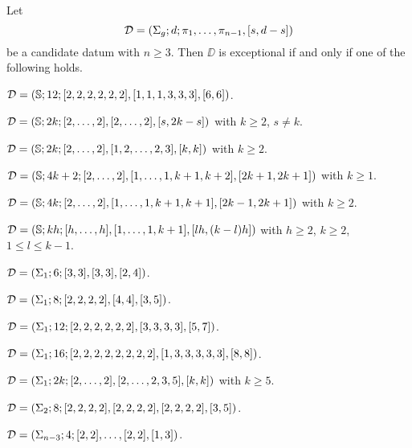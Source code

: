 \begin{solution-hurwitz*}
Let
\[
\mathcal{D}=(\Sigma_{g};d;\pi_1,\ldots,\pi_{n-1},[s,d-s])
\]
be a candidate datum with $n\ge 3$. Then $\DD$ is exceptional if and only if one of the following holds.
\begin{enumarabic}
\item $\mathcal{D}=(\mathbb{S}{};12;[2,2,2,2,2,2],[1,1,1,3,3,3],[6,6])$.
\item $\mathcal{D}=(\mathbb{S}{};2k;[2,\ldots,2],[2,\ldots,2],[s,2k-s])$ with $k\ge 2$, $s\neq k$.
\item $\mathcal{D}=(\mathbb{S}{};2k;[2,\ldots,2],[1,2,\ldots,2,3],[k,k])$ with $k\ge2$.
\item $\mathcal{D}=(\mathbb{S}{};4k+2;[2,\ldots,2],[1,\ldots,1,k+1,k+2],[2k+1,2k+1])$ with $k\ge 1$.
\item $\mathcal{D}=(\mathbb{S}{};4k;[2,\ldots,2],[1,\ldots,1,k+1,k+1],[2k-1,2k+1])$ with $k\ge2$.
\item $\mathcal{D}=(\mathbb{S}{};kh;[h,\ldots,h],[1,\ldots,1,k+1],[lh,(k-l)h])$ with $h\ge 2$, $k\ge 2$, $1\le l\le k-1$.
\item $\mathcal{D}=(\Sigma_{1};6;[3,3],[3,3],[2,4])$.
\item $\mathcal{D}=(\Sigma_{1};8;[2,2,2,2],[4,4],[3,5])$.
\item $\mathcal{D}=(\Sigma_{1};12;[2,2,2,2,2,2],[3,3,3,3],[5,7])$.
\item $\mathcal{D}=(\Sigma_{1};16;[2,2,2,2,2,2,2,2],[1,3,3,3,3,3],[8,8])$.
\item $\mathcal{D}=(\Sigma_{1};2k;[2,\ldots,2],[2,\ldots,2,3,5],[k,k])$ with $k\ge 5$.
\item $\mathcal{D}=(\Sigma_{2};8;[2,2,2,2],[2,2,2,2],[2,2,2,2],[3,5])$.
\item $\mathcal{D}=(\Sigma_{n-3};4;[2,2],\ldots,[2,2],[1,3])$.
\end{enumarabic}
\end{solution-hurwitz*}